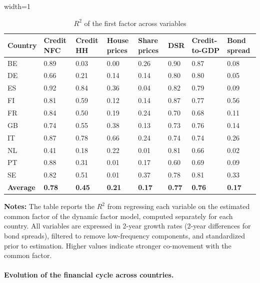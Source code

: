 \begin{table}[htbp]
  \centering
  \caption{$R^2$ of the first factor across variables}
  \begin{adjustbox}{width=1\textwidth}
    \begin{tabularx}{\textwidth}{lXXXXXXX}
    \toprule
    \textbf{Country} & \textbf{Credit NFC} & \textbf{Credit HH} & \textbf{House prices} & \textbf{Share prices} & \textbf{DSR} & \textbf{Credit-to-GDP} & \textbf{Bond spread} \\
    \midrule
    BE    & 0.89  & 0.03  & 0.00  & 0.26  & 0.90  & 0.87  & 0.08 \\
    DE    & 0.66  & 0.21  & 0.14  & 0.14  & 0.80  & 0.80  & 0.05 \\
    ES    & 0.92  & 0.84  & 0.36  & 0.04  & 0.82  & 0.79  & 0.09 \\
    FI    & 0.81  & 0.59  & 0.12  & 0.14  & 0.87  & 0.77  & 0.56 \\
    FR    & 0.84  & 0.50  & 0.19  & 0.24  & 0.70  & 0.68  & 0.11 \\
    GB    & 0.74  & 0.55  & 0.38  & 0.13  & 0.73  & 0.76  & 0.14 \\
    IT    & 0.87  & 0.78  & 0.66  & 0.24  & 0.74  & 0.74  & 0.26 \\
    NL    & 0.41  & 0.18  & 0.22  & 0.01  & 0.81  & 0.66  & 0.02 \\
    PT    & 0.88  & 0.31  & 0.01  & 0.17  & 0.60  & 0.69  & 0.09 \\
    SE    & 0.82  & 0.51  & 0.01  & 0.37  & 0.78  & 0.81  & 0.33 \\
    \midrule
    \textbf{Average} & \textbf{0.78} & \textbf{0.45} & \textbf{0.21} & \textbf{0.17} & \textbf{0.77} & \textbf{0.76} & \textbf{0.17} \\
    \bottomrule
    \end{tabularx}
  \end{adjustbox}
  \label{table_r2}
  \parbox{\textwidth}{\raggedright \footnotesize \textbf{Notes:} The table reports the $R^2$ from regressing each variable on the estimated common factor of the dynamic factor model, computed separately for each country. All variables are expressed in 2-year growth rates (2-year differences for bond spreads), filtered to remove low-frequency components, and standardized prior to estimation. Higher values indicate stronger co-movement with the common factor.}
\end{table}

\paragraph{Evolution of the financial cycle across countries.}

